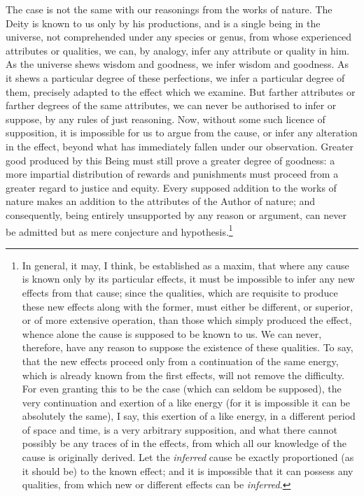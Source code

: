 \documentclass[]{article}
\newcounter{authornote}[page]
\newcommand*{\authornote}[1]{\renewcommand{\thefootnote}{\fnsymbol{footnote}}\stepcounter{authornote}\footnote[\value{authornote}]{#1}\renewcommand{\thefootnote}{\arabic{footnote}}}
\begin{document}
\begin{sectionbody}
\humeparagraph  The case is not the same with our reasonings from the works of nature. The Deity is known to us only by his productions, and is a single being in the universe, not comprehended under any species or genus, from whose experienced attributes or qualities, we can, by analogy, infer any attribute or quality in him. As the universe shews wisdom and goodness, we infer wisdom and goodness. As it shews a particular degree of these perfections, we infer a particular degree of them, precisely adapted to the effect which we examine. But farther attributes or farther degrees of the same attributes, we can never be authorised to infer or suppose, by any rules of just reasoning. Now, without some such licence of supposition, it is impossible for us to argue from the cause, or infer any alteration in the effect, beyond what has immediately fallen under our observation. Greater good produced by this Being must still prove a greater degree of goodness: a more impartial distribution of rewards and punishments must proceed from a greater regard to justice and equity. Every supposed addition to the works of nature makes an addition to the attributes of the Author of nature; and consequently, being entirely unsupported by any reason or argument, can never be admitted but as mere conjecture and hypothesis.\authornote{In general, it may, I think, be established as a maxim, that where any cause is known only by its particular effects, it must be impossible to infer any new effects from that cause; since the qualities, which are requisite to produce these new effects along with the former, must either be different, or superior, or of more extensive operation, than those which simply produced the effect, whence alone the cause is supposed to be known to us. We can never, therefore, have any reason to suppose the existence of these qualities. To say, that the new effects proceed only from a continuation of the same energy, which is already known from the first effects, will not remove the difficulty. For even granting this to be the case (which can seldom be supposed), the very continuation and exertion of a like energy (for it is impossible it can be absolutely the same), I say, this exertion of a like energy, in a different period of space and time, is a very arbitrary supposition, and what there cannot possibly be any traces of in the effects, from which all our knowledge of the cause is originally derived. Let the \emph{inferred} cause be exactly proportioned (as it should be) to the known effect; and it is impossible that it can possess any qualities, from which new or different effects can be \emph{inferred}.}


\end{sectionbody}
\end{document}
